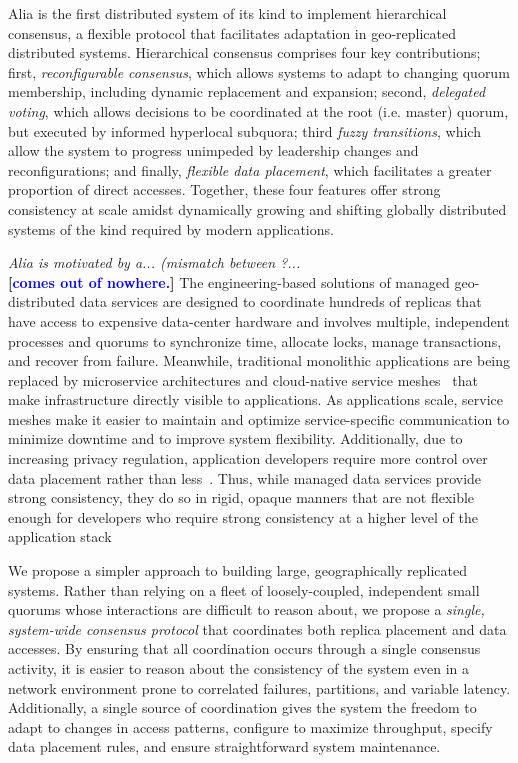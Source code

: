 \documentclass[11pt,conference]{IEEEtran}
\renewcommand{\pjk}[1]{{\bf
    [\marginpar[\hbox{{\textcolor{blue}{pjk}}\raisebox{0ex}{\Huge $\rightarrow$}}]%
{\hbox{\raisebox{0ex}{\Huge $\leftarrow$}{\textcolor{blue}{pjk}}}}\textcolor{blue}{#1}]}}
\begin{document}
Alia is the first distributed system of its kind to implement hierarchical consensus,
a flexible protocol that facilitates adaptation in geo-replicated distributed systems.
Hierarchical consensus comprises four key contributions; first, \emph{reconfigurable
consensus}, which allows systems to adapt to changing quorum membership, including
dynamic replacement and expansion; second, \emph{delegated voting}, which allows
decisions to be coordinated at the root (i.e. master) quorum, but executed by informed
hyperlocal subquora; third \emph{fuzzy transitions}, which allow the system to progress
unimpeded by leadership changes and reconfigurations; and finally, \emph{flexible data
placement}, which facilitates a greater proportion of direct accesses.
Together, these four features offer strong consistency at scale amidst dynamically
growing and shifting globally distributed systems of the kind required by modern
applications.

\emph{Alia is motivated by a...  (mismatch between ?...}
\\ \noindent
\pjk{comes out of nowhere.}
The engineering-based solutions of managed geo-distributed data services are designed to
coordinate hundreds of replicas that have access to expensive data-center hardware and
involves multiple, independent processes and quorums to synchronize time, allocate locks,
manage transactions, and recover from failure.
Meanwhile, traditional monolithic applications are being replaced by microservice
architectures and cloud-native service meshes~\cite{envoy} that make
infrastructure directly visible to applications.
As applications scale, service meshes make it easier to maintain and optimize
service-specific communication to minimize downtime and to improve system flexibility.
Additionally, due to increasing privacy regulation, application developers require more
control over data placement rather than less~\cite{gdpr}.
Thus, while managed data services provide strong consistency, they do so in rigid, 
opaque manners that are not flexible enough for developers who require strong consistency
at a higher level of the application stack

We propose a simpler approach to building large, geographically replicated systems.
Rather than relying on a fleet of loosely-coupled, independent small quorums whose
interactions are difficult to reason about, we propose a \emph{single, system-wide consensus
protocol} that coordinates both replica placement and data accesses.
By ensuring that all coordination occurs through a single consensus activity,
it is easier to reason about the consistency of the system even in a network environment
prone to correlated failures, partitions, and variable latency.
Additionally, a single source of coordination gives the system the freedom to adapt to
changes in access patterns, configure to maximize throughput, specify data placement
rules, and ensure straightforward system maintenance.
\end{document}
